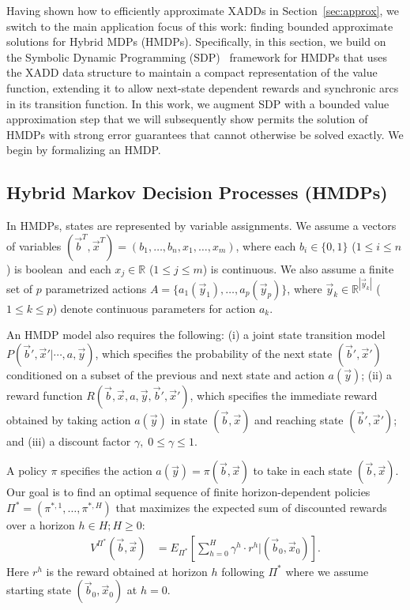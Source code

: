 \label{sec:basdp}

Having shown how to efficiently approximate XADDs in
Section~\ref{sec:approx}, we switch to the main application focus of
this work: finding bounded approximate solutions for Hybrid MDPs
(HMDPs).  Specifically, in this section, we build on the Symbolic
Dynamic Programming (SDP)~\cite{sanner_uai11,zamani12} framework for
HMDPs that uses the XADD data structure to maintain a compact
representation of the value function, extending it to allow next-state
dependent rewards and synchronic arcs in its transition function.  In
this work, we augment SDP with a bounded value approximation step that
we will subsequently show permits the solution of HMDPs with strong
error guarantees that cannot otherwise be solved exactly.  We begin by
formalizing an HMDP.

\subsection{Hybrid Markov Decision Processes (HMDPs) }

In HMDPs, states are represented by variable assignments. We assume a
vectors of variables $(\vec{b}^T,\vec{x}^T) = (
b_1,\ldots,b_n,x_{1},\ldots,x_m )$, where each $b_i \in \{ 0,1 \}$
($1 \leq i \leq n$) is boolean$\,$ and each $x_j \in \mathbb{R}$
($1 \leq j \leq m$) is continuous. We also assume a finite set of $p$
parametrized actions $A = \{ a_1(\vec{y}_1), \ldots,
a_p(\vec{y}_p) \}$, where $\vec{y}_k \in \mathbb{R}^{|\vec{y}_k|}$
($1 \leq k \leq p$) denote continuous parameters for action $a_k$.

An HMDP model also requires the following: (i) a joint state transition
model $P(\vec{b}',\vec{x}'|\cdots,a,\vec{y})$, which specifies the
probability of the next state $(\vec{b}',\vec{x}')$ conditioned on a
subset of the previous and next state and action $a(\vec{y})$; (ii) a
reward function $R(\vec{b},\vec{x},a,\vec{y},\vec{b}',\vec{x}')$,
which specifies the immediate reward obtained by taking action
$a(\vec{y})$ in state $(\vec{b},\vec{x})$ and reaching state
$(\vec{b}',\vec{x}')$; and (iii) a discount factor $\gamma, \;
0 \leq \gamma \leq 1$.

A policy $\pi$ specifies the action $a(\vec{y}) =
\pi(\vec{b},\vec{x})$ to take in each state $(\vec{b},\vec{x})$.  Our
goal is to find an optimal sequence of finite horizon-dependent
policies $\Pi^* = (\pi^{*,1},\ldots,\pi^{*,H})$ that
maximizes the expected sum of discounted rewards over a horizon $h \in
H; H \geq 0$:
\begin{align}
V^{\Pi^*}(\vec{b},\vec{x}) & = E_{\Pi^*} \left[ \sum_{h=0}^{H} \gamma^h \cdot r^h \Big| (\vec{b}_0,\vec{x}_0) \right]. \label{eq:vfun_def}
\end{align}
Here $r^h$ is the reward obtained at horizon $h$ following $\Pi^*$
where we assume starting state $(\vec{b}_0,\vec{x}_0)$ at $h=0$.

